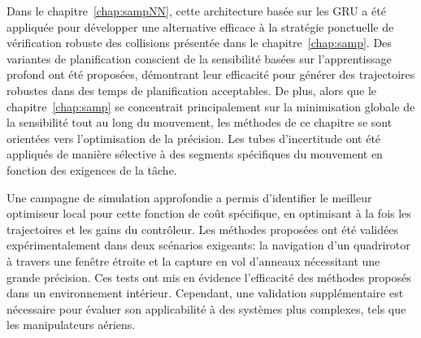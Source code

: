 Dans le chapitre~\ref{chap:sampNN}, cette architecture basée sur les GRU a été appliquée pour développer une alternative efficace à la stratégie ponctuelle de vérification robuste des collisions présentée dans le chapitre~\ref{chap:samp}. 
Des variantes de planification conscient de la sensibilité basées sur l'apprentissage profond ont été proposées, démontrant leur efficacité pour générer des trajectoires robustes dans des temps de planification acceptables. 
De plus, alors que le chapitre~\ref{chap:samp} se concentrait principalement sur la minimisation globale de la sensibilité tout au long du mouvement, les méthodes de ce chapitre se sont orientées vers l'optimisation de la précision. 
Les tubes d'incertitude ont été appliqués de manière sélective à des segments spécifiques du mouvement en fonction des exigences de la tâche.

Une campagne de simulation approfondie a permis d'identifier le meilleur optimiseur local pour cette fonction de coût spécifique, en optimisant à la fois les trajectoires et les gains du contrôleur. 
Les méthodes proposées ont été validées expérimentalement dans deux scénarios exigeants: la navigation d'un quadrirotor à travers une fenêtre étroite et la capture en vol d'anneaux nécessitant une grande précision. 
Ces tests ont mis en évidence l'efficacité des méthodes proposés dans un environnement intérieur. 
Cependant, une validation supplémentaire est nécessaire pour évaluer son applicabilité à des systèmes plus complexes, tels que les manipulateurs aériens.